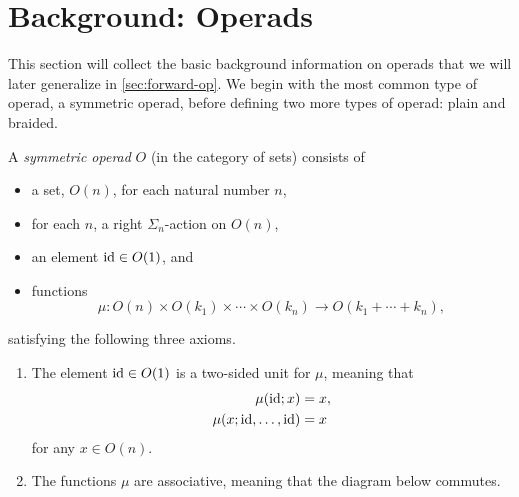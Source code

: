 
\section{Background: Operads}\label{sec:back-op}

This section will collect the basic background information on operads that we will later generalize in
\cref{sec:forward-op}. We begin with the most common type of operad, a symmetric operad, before defining two more types of operad: plain and braided. 

\begin{Defi}\label{Defi:sym-op}
A \textit{symmetric operad} $O$ (in the category of sets) consists of
\begin{itemize}
\item a set, $O(n)$, for each natural number $n$,
\item for each $n$, a right $\Sigma_{n}$-action on $O(n)$,
\item an element $\textrm{id} \in O(1)$, and
\item functions
  \[
    \mu \colon  O(n) \times O(k_{1}) \times \cdots \times O(k_{n}) \rightarrow O(k_{1} + \cdots + k_{n}),
  \]
\end{itemize}
satisfying the following three axioms.
\begin{enumerate}
\item The element $\textrm{id} \in O(1)$ is a two-sided unit for $\mu$, meaning that
  \begin{align*}
    \mu(\textrm{id};x) &= x,\\
    \mu(x;\textrm{id},\ldots,\textrm{id}) &= x
  \end{align*}
for any $x \in O(n)$.
\item The functions $\mu$ are associative, meaning that the diagram below commutes.



\end{enumerate}
\end{Defi}
